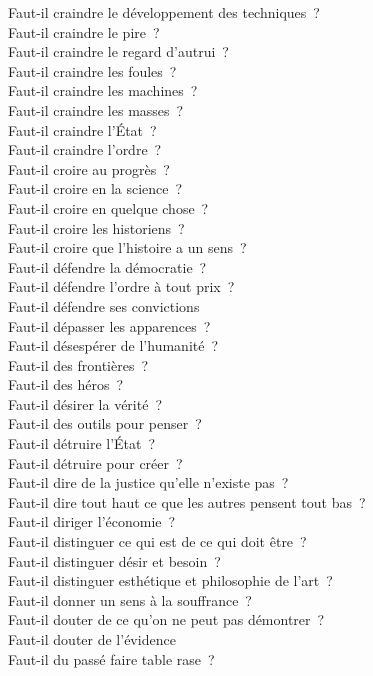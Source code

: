 \documentclass[a4paper,12pt]{article}
\begin{document}
Faut-il craindre le développement des techniques ? \\
Faut-il craindre le pire ? \\
Faut-il craindre le regard d'autrui ? \\
Faut-il craindre les foules ? \\
Faut-il craindre les machines ? \\
Faut-il craindre les masses ? \\
Faut-il craindre l'État ? \\
Faut-il craindre l'ordre ? \\
Faut-il croire au progrès ? \\
Faut-il croire en la science ? \\
Faut-il croire en quelque chose ? \\
Faut-il croire les historiens ? \\
Faut-il croire que l'histoire a un sens ? \\
Faut-il défendre la démocratie ? \\
Faut-il défendre l'ordre à tout prix ? \\
Faut-il défendre ses convictions \\
Faut-il dépasser les apparences ? \\
Faut-il désespérer de l'humanité ? \\
Faut-il des frontières ? \\
Faut-il des héros ? \\
Faut-il désirer la vérité ? \\
Faut-il des outils pour penser ? \\
Faut-il détruire l'État ? \\
Faut-il détruire pour créer ? \\
Faut-il dire de la justice qu'elle n'existe pas ? \\
Faut-il dire tout haut ce que les autres pensent tout bas ? \\
Faut-il diriger l'économie ? \\
Faut-il distinguer ce qui est de ce qui doit être ? \\
Faut-il distinguer désir et besoin ? \\
Faut-il distinguer esthétique et philosophie de l'art ? \\
Faut-il donner un sens à la souffrance ? \\
Faut-il douter de ce qu'on ne peut pas démontrer ? \\
Faut-il douter de l'évidence \\
Faut-il du passé faire table rase ? \\
\end{document}
